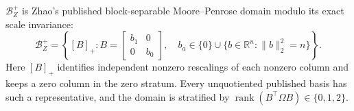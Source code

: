 \(\mathcal B_Z^+\) is Zhao's published block-separable Moore--Penrose domain modulo its exact scale invariance:
\[
 \mathcal B_Z^+=\left\{[B]_+:B=\begin{bmatrix}b_1&0\\0&b_0\end{bmatrix},\quad
 b_a\in\{0\}\cup\{b\in\mathbb R^n:\lVert b\rVert_2^2=n\}\right\}.
\]
Here \([B]_+\) identifies independent nonzero rescalings of each nonzero column and keeps a zero column in the zero stratum.  Every unquotiented published basis has such a representative, and the domain is stratified by \(\operatorname{rank}(B^{\top}\Omega B)\in\{0,1,2\}\).